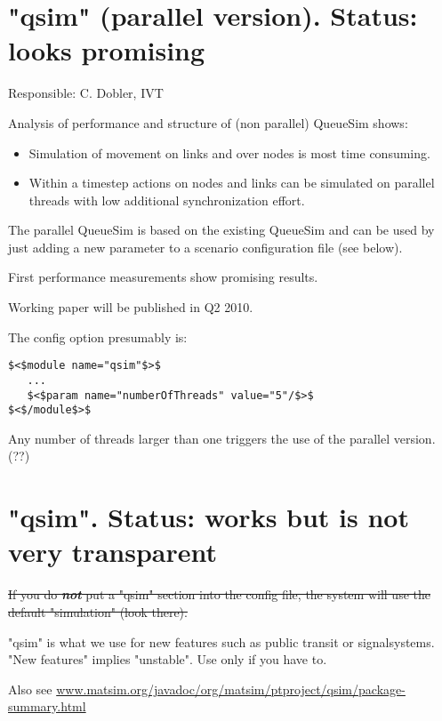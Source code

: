 \documentclass[a4paper,11pt]{report}
\begin{document}
\vfill\eject
\section{"qsim" (parallel version). Status: looks promising}

Responsible: C. Dobler, IVT

Analysis of performance and structure of (non parallel) QueueSim shows:
\begin{itemize}
	\item Simulation of movement on links and over nodes is most time consuming.
	\item Within a timestep actions on nodes and links can be simulated on parallel threads with low additional synchronization effort.
\end{itemize}

The  parallel QueueSim is based on the existing QueueSim and can be used by  just adding a new parameter to a scenario configuration file (see  below).

First performance measurements show promising results.

Working paper will be published in Q2 2010.



The config option presumably is:
\begin{verbatim}
$<$module name="qsim"$>$
   ...
   $<$param name="numberOfThreads" value="5"/$>$
$<$/module$>$

\end{verbatim}

Any number of threads larger than one triggers the use of the parallel version. (??)

\vfill\eject
\section{"qsim". Status: works but is not very transparent}

\sout{If you do \textbf{\emph{not}} put a "qsim" section into the config file, the system will use the default "simulation" (look there).}

"qsim"  is what we use for new features such as public transit or  signalsystems. "New features" implies "unstable". Use only  if you have to.

Also see \href{http://www.matsim.org/javadoc/org/matsim/ptproject/qsim/package-summary.html}{www.matsim.org/javadoc/org/matsim/ptproject/qsim/package-summary.html}
\end{document}
